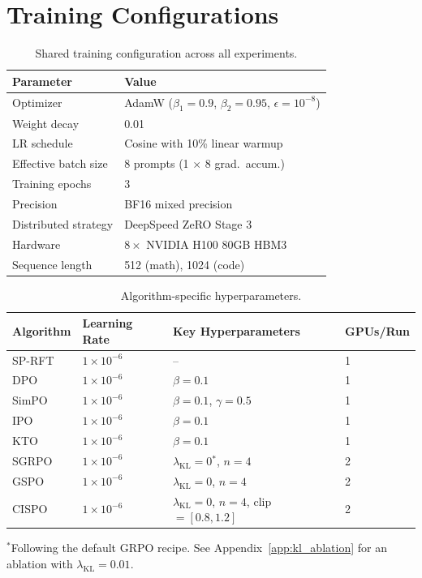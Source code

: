 \documentclass{article}
\newcommand{\sprft}{SP-RFT}
\begin{document}
\section{Training Configurations}
\label{app:configs}

\begin{table}[ht]
\centering
\caption{Shared training configuration across all experiments.}
\small
\begin{tabular}{@{}ll@{}}
\toprule
\textbf{Parameter} & \textbf{Value} \\
\midrule
Optimizer & AdamW ($\beta_1\!=\!0.9$, $\beta_2\!=\!0.95$, $\epsilon\!=\!10^{-8}$) \\
Weight decay & 0.01 \\
LR schedule & Cosine with 10\% linear warmup \\
Effective batch size & 8 prompts (1 $\times$ 8 grad.\ accum.) \\
Training epochs & 3 \\
Precision & BF16 mixed precision \\
Distributed strategy & DeepSpeed ZeRO Stage 3 \\
Hardware & $8\times$ NVIDIA H100 80GB HBM3 \\
Sequence length & 512 (math), 1024 (code) \\
\bottomrule
\end{tabular}
\end{table}

\begin{table}[ht]
\centering
\caption{Algorithm-specific hyperparameters.}
\small
\begin{tabular}{@{}llll@{}}
\toprule
\textbf{Algorithm} & \textbf{Learning Rate} & \textbf{Key Hyperparameters} & \textbf{GPUs/Run} \\
\midrule
\sprft{} & $1\!\times\!10^{-6}$ & -- & 1 \\
DPO & $1\!\times\!10^{-6}$ & $\beta = 0.1$ & 1 \\
SimPO & $1\!\times\!10^{-6}$ & $\beta = 0.1$, $\gamma = 0.5$ & 1 \\
IPO & $1\!\times\!10^{-6}$ & $\beta = 0.1$ & 1 \\
KTO & $1\!\times\!10^{-6}$ & $\beta = 0.1$ & 1 \\
SGRPO & $1\!\times\!10^{-6}$ & $\lambda_{\text{KL}} = 0$$^*$, $n = 4$ & 2 \\
GSPO & $1\!\times\!10^{-6}$ & $\lambda_{\text{KL}} = 0$, $n = 4$ & 2 \\
CISPO & $1\!\times\!10^{-6}$ & $\lambda_{\text{KL}} = 0$, $n = 4$, clip $= [0.8, 1.2]$ & 2 \\
\bottomrule
\end{tabular}
\vspace{2pt}
{\footnotesize $^*$Following the default GRPO recipe. See Appendix~\ref{app:kl_ablation} for an ablation with $\lambda_{\text{KL}} = 0.01$.}
\end{table}
\end{document}
